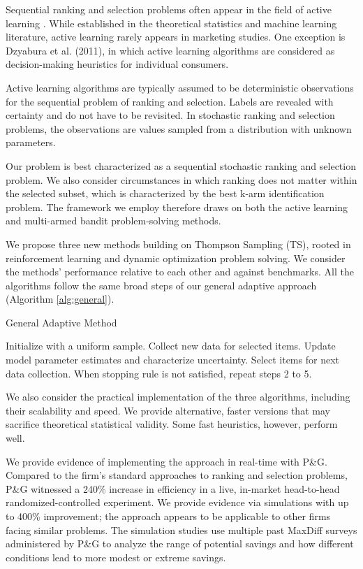 \documentclass[a4paper,11pt]{article}
\begin{document}
Sequential ranking and selection problems often appear in the field of active learning \citep{balcan2009agnostic,dasgupta2008general}. While established in the theoretical statistics and machine learning literature, active learning rarely appears in marketing studies. One exception is Dzyabura et al. (2011), in which active learning algorithms are considered as decision-making heuristics for individual consumers. 

Active learning algorithms are typically assumed to be deterministic observations for the sequential problem of ranking and selection. Labels are revealed with certainty and do not have to be revisited. In stochastic ranking and selection problems, the observations are values sampled from a distribution with unknown parameters.

Our problem is best characterized as a sequential stochastic ranking and selection problem. We also consider circumstances in which ranking does not matter within the selected subset, which is characterized by the best k-arm identification problem. The framework we employ therefore draws on both the active learning and multi-armed bandit problem-solving methods.

We propose three new methods building on Thompson Sampling (TS), rooted in reinforcement learning and dynamic optimization problem solving. We consider the methods' performance relative to each other and against benchmarks. All the algorithms follow the same broad steps of our general adaptive approach (Algorithm \ref{alg:general}).

\begin{algorithm}
\caption{General Adaptive Method} \label{alg:general}
\begin{algorithmic}[1]
\State Initialize with a uniform sample.
\State Collect new data for selected items.
\State Update model parameter estimates and characterize uncertainty.
\State Select items for next data collection.
\State When stopping rule is not satisfied, repeat steps 2 to 5.
\end{algorithmic}
\end{algorithm}

We also consider the practical implementation of the three algorithms, including their scalability and speed. We provide alternative, faster versions that may sacrifice theoretical statistical validity. Some fast heuristics, however, perform well.

We provide evidence of implementing the approach in real-time with P\&G. Compared to the firm's standard approaches to ranking and selection problems, P\&G witnessed a 240\% increase in efficiency in a live, in-market head-to-head randomized-controlled experiment. We provide evidence via simulations with up to 400\% improvement; the approach appears to be applicable to other firms facing similar problems. The simulation studies use multiple past MaxDiff surveys administered by P\&G to analyze the range of potential savings and how different conditions lead to more modest or extreme savings.
\end{document}
